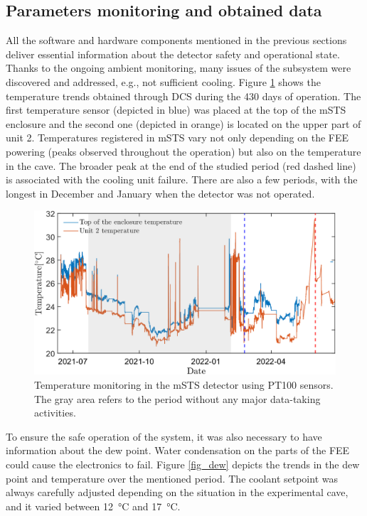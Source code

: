 \subsection{Parameters monitoring and obtained data}
All the software and hardware components mentioned in the previous sections deliver essential information about the detector safety and operational state. Thanks to the ongoing ambient monitoring, many issues of the subsystem were discovered and addressed, e.g., not sufficient cooling. Figure \ref{fig_temp} shows the temperature trends obtained through \gls{DCS} during the 430 days of operation. The first temperature sensor (depicted in blue) was placed at the top of the \gls{mSTS} enclosure and the second one (depicted in orange) is located on the upper part of unit 2. Temperatures registered in \gls{mSTS} vary not only depending on the \gls{FEE} powering (peaks observed throughout the operation) but also on the temperature in the cave. The broader peak at the end of the studied period (red dashed line) is associated with the cooling unit failure. There are also a few periods, with the longest in December and January when the detector was not operated. 

\begin{figure}[!h]
\centering
\includegraphics[width=0.9\columnwidth]{Chapter6/DCS/images/temp2.png}
\caption{Temperature monitoring in the \gls{mSTS} detector using PT100 sensors. The gray area refers to the period without any major data-taking activities.}
\label{fig_temp}
\end{figure}
\newpage
To ensure the safe operation of the system, it was also necessary to have information about the dew point. Water condensation on the parts of the \gls{FEE} could cause the electronics to fail. Figure \ref{fig_dew} depicts the trends in the dew point and temperature over the mentioned period. The coolant setpoint was always carefully adjusted depending on the situation in the experimental cave, and it varied between \SI{12}{\celsius} and \SI{17}{\celsius}.

